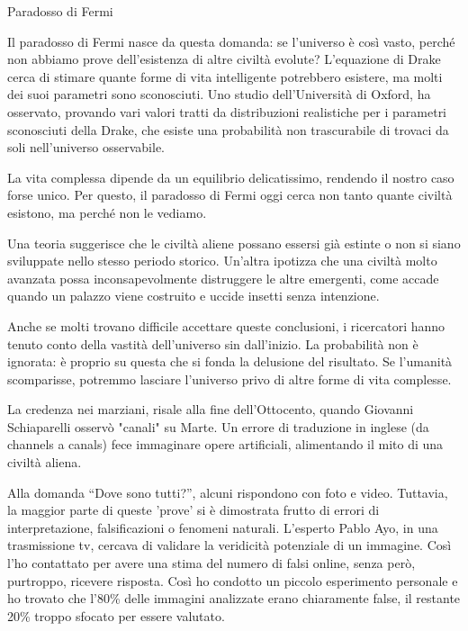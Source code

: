 \documentclass[12pt]{book} %
\begin{document}
\begin{mdframed}[linewidth=1pt]
Paradosso di Fermi

Il paradosso di Fermi nasce da questa domanda: se l’universo è così vasto, perché non abbiamo prove dell’esistenza di altre civiltà evolute? L’equazione di Drake cerca di stimare quante forme di vita intelligente potrebbero esistere, ma molti dei suoi parametri sono sconosciuti. Uno studio dell’Università di Oxford, ha osservato, provando vari valori tratti da distribuzioni realistiche per i parametri sconosciuti della Drake, che esiste una probabilità non trascurabile di trovaci da soli nell’universo osservabile.

La vita complessa dipende da un equilibrio delicatissimo, rendendo il nostro caso forse unico. Per questo, il paradosso di Fermi oggi cerca non tanto quante civiltà esistono, ma perché non le vediamo.

Una teoria suggerisce che le civiltà aliene possano essersi già estinte o non si siano sviluppate nello stesso periodo storico. Un’altra ipotizza che una civiltà molto avanzata possa inconsapevolmente distruggere le altre emergenti, come accade quando un palazzo viene costruito e uccide insetti senza intenzione.

Anche se molti trovano difficile accettare queste conclusioni, i ricercatori hanno tenuto conto della vastità dell’universo sin dall’inizio. La probabilità non è ignorata: è proprio su questa che si fonda la delusione del risultato. Se l’umanità scomparisse, potremmo lasciare l’universo privo di altre forme di vita complesse.

La credenza nei marziani, risale alla fine dell’Ottocento, quando Giovanni Schiaparelli osservò "canali" su Marte. Un errore di traduzione in inglese (da channels a canals) fece immaginare opere artificiali, alimentando il mito di una civiltà aliena.

Alla domanda “Dove sono tutti?”, alcuni rispondono con foto e video. Tuttavia, la maggior parte di queste 'prove' si è dimostrata frutto di errori di interpretazione, falsificazioni o fenomeni naturali. L’esperto Pablo Ayo, in una trasmissione tv, cercava di validare la veridicità potenziale di un immagine. Così l'ho contattato per avere una stima del numero di falsi online, senza però, purtroppo, ricevere risposta. Così ho condotto un piccolo esperimento personale e ho trovato che l’80\% delle immagini analizzate erano chiaramente false, il restante 20\% troppo sfocato per essere valutato.


\end{mdframed}
\end{document}
